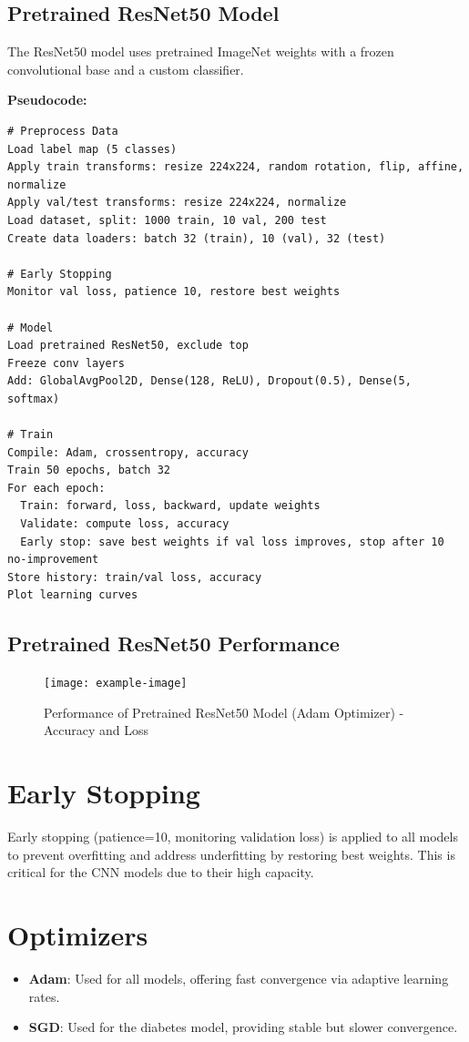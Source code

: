 \documentclass[a4paper,12pt]{article}
\begin{document}
\subsection*{Pretrained ResNet50 Model}
The ResNet50 model uses pretrained ImageNet weights with a frozen convolutional base and a custom classifier.

\textbf{Pseudocode:}
\begin{verbatim}
# Preprocess Data
Load label map (5 classes)
Apply train transforms: resize 224x224, random rotation, flip, affine, normalize
Apply val/test transforms: resize 224x224, normalize
Load dataset, split: 1000 train, 10 val, 200 test
Create data loaders: batch 32 (train), 10 (val), 32 (test)

# Early Stopping
Monitor val loss, patience 10, restore best weights

# Model
Load pretrained ResNet50, exclude top
Freeze conv layers
Add: GlobalAvgPool2D, Dense(128, ReLU), Dropout(0.5), Dense(5, softmax)

# Train
Compile: Adam, crossentropy, accuracy
Train 50 epochs, batch 32
For each epoch:
  Train: forward, loss, backward, update weights
  Validate: compute loss, accuracy
  Early stop: save best weights if val loss improves, stop after 10 no-improvement
Store history: train/val loss, accuracy
Plot learning curves
\end{verbatim}

\subsection*{Pretrained ResNet50 Performance}
\begin{figure}[H]
    \centering
    \texttt{[image: example-image]}
    \caption{Performance of Pretrained ResNet50 Model (Adam Optimizer) - Accuracy and Loss}
\end{figure}

\section*{Early Stopping}
Early stopping (patience=10, monitoring validation loss) is applied to all models to prevent overfitting and address underfitting by restoring best weights. This is critical for the CNN models due to their high capacity.

\section*{Optimizers}
\begin{itemize}
    \item \textbf{Adam}: Used for all models, offering fast convergence via adaptive learning rates.
    \item \textbf{SGD}: Used for the diabetes model, providing stable but slower convergence.
\end{itemize}
\end{document}
